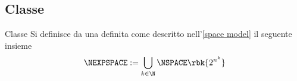 \documentclass[a4paper, 12pt]{report}
\begin{document}
    \subsection{Classe \NEXPSPACE}

    \begin{frameddefn}{Classe \NEXPSPACE}
        Si definisce  da una \NTM definita come descritto nell'\cref{space model} il seguente insieme $$\NEXPSPACE := \bigcup_{k \in \N}{\NSPACE \rbk{2^{n^k}}}$$
    \end{frameddefn}
\end{document}
